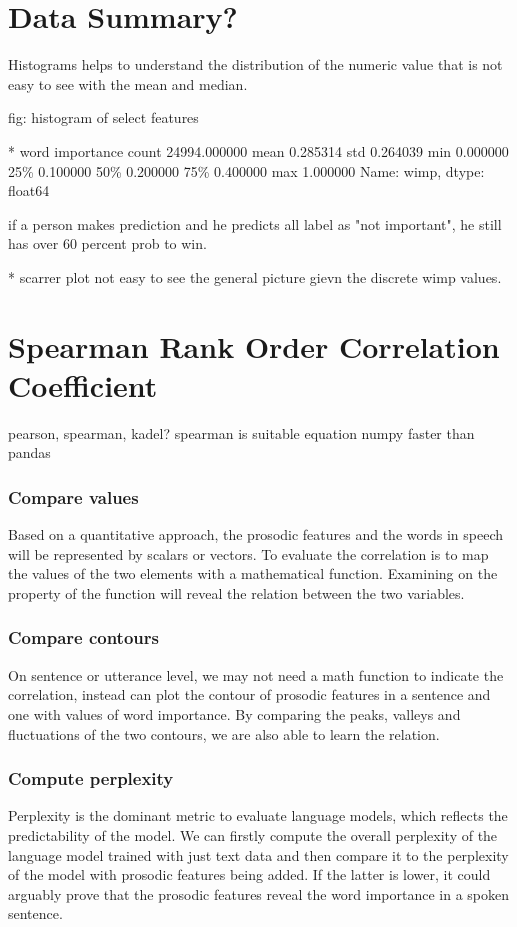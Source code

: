 \section{Data Summary?}

Histograms helps to understand the distribution of the numeric value that is not easy to see with the mean and median.

fig: histogram of select features

* word importance
count    24994.000000
mean         0.285314
std          0.264039
min          0.000000
25\%          0.100000
50\%          0.200000
75\%          0.400000
max          1.000000
Name: wimp, dtype: float64

if a person makes prediction and he predicts all label as "not important", he still has over 60 percent prob to win.

* scarrer plot
not easy to see the general picture gievn the discrete wimp values.

\section{Spearman Rank Order Correlation Coefficient}
pearson, spearman, kadel?
spearman is suitable
equation
numpy faster than pandas

\subsubsection{Compare values}
Based on a quantitative approach, the prosodic features and the words in speech will be represented by scalars or vectors. To evaluate the correlation is to map the values of the two elements with a mathematical function. Examining on the property of the function will reveal the relation between the two variables. 

\subsubsection{Compare contours}
On sentence or utterance level, we may not need a math function to indicate the correlation, instead can plot the contour of prosodic features in a sentence and one with values of word importance. By comparing the peaks, valleys and fluctuations of the two contours, we are also able to learn the relation.

\subsubsection{Compute perplexity}
Perplexity is the dominant metric to evaluate language models, which reflects the predictability of the model. We can firstly compute the overall perplexity of the language model trained with just text data and then compare it to the perplexity of the model with prosodic features being added. If the latter is lower, it could arguably prove that the prosodic features reveal the word importance in a spoken sentence.

